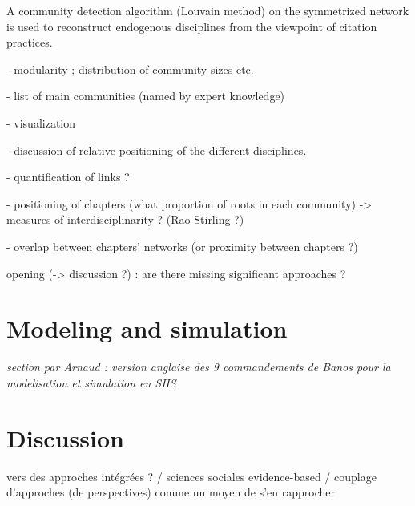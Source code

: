 A community detection algorithm (Louvain method) on the symmetrized network is used to reconstruct endogenous disciplines from the viewpoint of citation practices.



 - modularity ; distribution of community sizes etc.

 - list of main communities (named by expert knowledge)

 - visualization

 - discussion of relative positioning of the different disciplines.

 - quantification of links ?

 - positioning of chapters (what proportion of roots in each community) -> measures of interdisciplinarity ? (Rao-Stirling ?)
 
 - overlap between chapters' networks (or proximity between chapters ?)

 opening (-> discussion ?) : are there missing significant approaches ?



\section{Modeling and simulation}

\textit{section par Arnaud : version anglaise des 9 commandements de Banos pour la modelisation et simulation en SHS}






\section{Discussion}


 vers des approches intégrées ? / sciences sociales evidence-based / couplage d'approches (de perspectives) comme un moyen de s'en rapprocher

